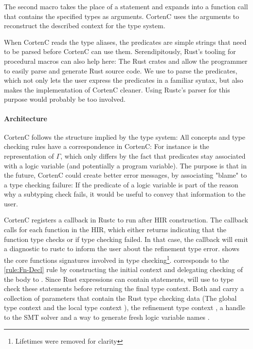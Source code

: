 \documentclass[twoside, english]{sdqthesis}
\theoremstyle{definition}
\begin{document}
The second macro  takes the place of a statement and expands into a function call that contains the specified types as arguments. CortenC uses the arguments to reconstruct the described context for the type system.

When CortenC reads the type aliases, the predicates are simple strings that need to be parsed before CortenC can use them.
Serendipitously, Rust's tooling for procedural macros can also help here: The Rust crates  and  allow the programmer to easily parse and generate Rust source code. We use  to parse the predicates, which not only lets the user express the predicates in a familiar syntax, but also makes the implementation of CortenC cleaner. Using Rustc's parser for this purpose would probably be too involved.

\paragraph{Architecture}
CortenC follows the structure implied by the type system: All concepts and type checking rules have a correspondence in CortenC: For instance  is the representation of $\Gamma$, which only differs by the fact that predicates stay associated with a logic variable (and potentially a program variable). The purpose is that in the future, CortenC could create better error messages, by associating "blame" to a type checking failure: If the predicate of a logic variable is part of the reason why a subtyping check fails, it would be useful to convey that information to the user.

CortenC registers a callback in Rustc to run after HIR construction. The callback calls  for each function in the HIR, which either returns  indicating that the function type checks or  if type checking failed. In that case, the callback will emit a diagnostic to rustc to inform the user about the refinement type error.
 shows the core functions signatures involved in type checking\footnote{Lifetimes were removed for clarity}.  corresponds to the \cref{rule:Fn-Decl} rule by constructing the initial context and delegating checking of the body to . 
Since Rust expressions can contain statements,  will use  to type check these statements before returning the final type context.
Both  and  carry a collection of parameters that contain the Rust type checking data (The global type context  and the local type context ), the refinement type context , a handle to the SMT solver  and a way to generate fresh logic variable names .
\end{document}
